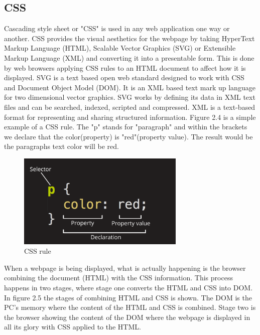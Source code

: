 \subsection{CSS} 
Cascading style sheet or "CSS" is used in any web application one way or another\cite{CSS_Introduction}. %
CSS provides the visual aesthetics for the webpage by taking HyperText Markup Language (HTML), Scalable Vector Graphics (SVG) or Extensible Markup Language (XML) and converting it into a presentable form\cite{What_is_CSS}. This is done by web browsers applying CSS rules to an HTML document to affect how it is displayed. SVG is a text based open web standard designed to work with CSS and Document Object Model (DOM). It is an XML based text mark up language for two dimensional vector graphics\cite{SVG_definition}. SVG works by defining its data in XML text files and can be searched, indexed, scripted and compressed\cite{SVG_functions}. XML is a text-based format for representing and sharing structured information\cite{What_is_XML}. Figure 2.4 is a simple example of a CSS rule. The "p" stands for "paragraph" and within the brackets we declare that the color(property) is "red"(property value). The result would be the paragraphs text color will be red.
\begin{figure}[h]
    \centering
    \includegraphics[width=80mm]{figures/css-declaration-small.png}
    \caption{CSS rule}
    \label{fig:Css rule example}
\end{figure}
When a webpage is being displayed, what is actually happening is the browser combining the document (HTML) with the CSS information\cite{CSS_and_DOM}. This process happens in two stages, where stage one converts the HTML and CSS into DOM\cite{What_is_DOM}. In figure 2.5 the stages of combining HTML and CSS is shown. The DOM is the PC's memory where the content of the HTML and CSS is combined. Stage two is the browser showing the content of the DOM where the webpage is displayed in all its glory with CSS applied to the HTML.

